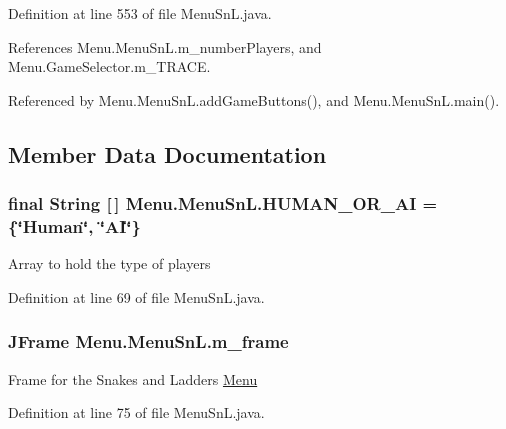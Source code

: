 Definition at line 553 of file Menu\+Sn\+L.\+java.



References Menu.\+Menu\+Sn\+L.\+m\+\_\+number\+Players, and Menu.\+Game\+Selector.\+m\+\_\+\+T\+R\+A\+C\+E.



Referenced by Menu.\+Menu\+Sn\+L.\+add\+Game\+Buttons(), and Menu.\+Menu\+Sn\+L.\+main().



\subsection{Member Data Documentation}
\hypertarget{class_menu_1_1_menu_sn_l_a7cd650c1f3cf334aafb3be5b3ad1b158}{}
\subsubsection[{H\+U\+M\+A\+N\+\_\+\+O\+R\+\_\+\+A\+I}]{\setlength{\rightskip}{0pt plus 5cm}final String \mbox{[}$\,$\mbox{]} Menu.\+Menu\+Sn\+L.\+H\+U\+M\+A\+N\+\_\+\+O\+R\+\_\+\+A\+I = \{\char`\"{}Human\char`\"{}, \char`\"{}A\+I\char`\"{}\}\hspace{0.3cm}{\ttfamily [private]}}\label{class_menu_1_1_menu_sn_l_a7cd650c1f3cf334aafb3be5b3ad1b158}
Array to hold the type of players 

Definition at line 69 of file Menu\+Sn\+L.\+java.

\hypertarget{class_menu_1_1_menu_sn_l_af43a9353bb0cfe3d29fa37d67b794a65}{}
\subsubsection[{m\+\_\+frame}]{\setlength{\rightskip}{0pt plus 5cm}J\+Frame Menu.\+Menu\+Sn\+L.\+m\+\_\+frame\hspace{0.3cm}{\ttfamily [private]}}\label{class_menu_1_1_menu_sn_l_af43a9353bb0cfe3d29fa37d67b794a65}
Frame for the Snakes and Ladders \hyperlink{namespace_menu}{Menu} 

Definition at line 75 of file Menu\+Sn\+L.\+java.

\hypertarget{class_menu_1_1_menu_sn_l_ac45af15bf2aabd1916063700e1e44f08}{}

